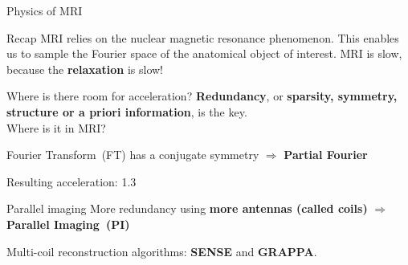 \begin{frame}{Physics of MRI }
    \begin{block}{Recap}
        MRI relies on the nuclear magnetic resonance phenomenon. This enables us to sample the Fourier space of the anatomical object of interest.
        MRI is slow, because the \textbf{relaxation} is slow!
    \end{block}
    \pause
\end{frame}

\begin{frame}{Where is there room for acceleration?}
    \textbf{Redundancy}, or \textbf{sparsity, symmetry, structure or a priori information}, is the key.\\

    \pause
        \hfill \break
        Where is it in MRI?

        Fourier Transform~(FT) has a conjugate symmetry $\Rightarrow$ \textbf{Partial Fourier}
        
        Resulting acceleration: 1.3
    
    
\end{frame}

\begin{frame}{Parallel imaging}
    More redundancy using \textbf{more antennas (called coils)} $\Rightarrow$ \textbf{Parallel Imaging~(PI)}
     
    Multi-coil reconstruction algorithms: \textbf{SENSE} and \textbf{GRAPPA}.
\end{frame}

